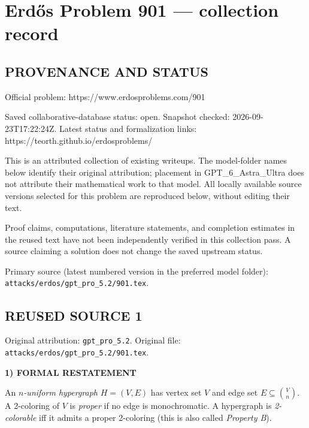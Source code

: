 \section*{Erd\H{o}s Problem 901 --- collection record}

\subsection*{PROVENANCE AND STATUS}
Official problem: https://www.erdosproblems.com/901

Saved collaborative-database status: open.
Snapshot checked: 2026-09-23T17:22:24Z.
Latest status and formalization links: https://teorth.github.io/erdosproblems/

This is an attributed collection of existing writeups. The model-folder names below identify their original attribution; placement in GPT\_6\_Astra\_Ultra does not attribute their mathematical work to that model. All locally available source versions selected for this problem are reproduced below, without editing their text.

Proof claims, computations, literature statements, and completion estimates in the reused text have not been independently verified in this collection pass. A source claiming a solution does not change the saved upstream status.

Primary source (latest numbered version in the preferred model folder): \texttt{attacks/erdos/gpt\_pro\_5.2/901.tex}.

\subsection*{REUSED SOURCE 1}
Original attribution: \texttt{gpt\_pro\_5.2}.
Original file: \texttt{attacks/erdos/gpt\_pro\_5.2/901.tex}.



\noindent\textbf{1) FORMAL RESTATEMENT}

An \emph{$n$-uniform hypergraph} $H=(V,E)$ has vertex set $V$ and edge set
$E\subseteq\binom{V}{n}$.
A 2-coloring of $V$ is \emph{proper} if no edge is monochromatic.
A hypergraph is \emph{2-colorable} iff it admits a proper 2-coloring (this is
also called \emph{Property B}).

